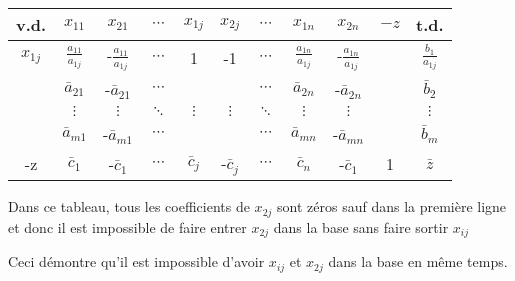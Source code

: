 \begin{center}
	\renewcommand{\arraystretch}{1.5}
	\begin{tabular}{|c|ccccccccc|c|}
		\hline
		  v.d.   &        $x_{11}$         &         $x_{21}$         & $\cdots$ &  $x_{1j}$   &   $x_{2j}$   & $\cdots$ &        $x_{1n}$         &         $x_{2n}$         & $-z$ &          t.d.          \\ \hline
		$x_{1j}$ & $\frac{a_{11}}{a_{1j}}$ & -$\frac{a_{11}}{a_{1j}}$ & $\cdots$ &      1      &      -1      & $\cdots$ & $\frac{a_{1n}}{a_{1j}}$ & -$\frac{a_{1n}}{a_{1j}}$ &      & $\frac{b_{1}}{a_{1j}}$ \\
		         &     $\bar{a}_{21}$      &     -$\bar{a}_{21}$      & $\cdots$ &             &              & $\cdots$ &     $\bar{a}_{2n}$      &     -$\bar{a}_{2n}$      &      &     $\bar{b}_{2}$      \\
		         &        $\vdots$         &         $\vdots$         & $\ddots$ &  $\vdots$   &   $\vdots$   & $\ddots$ &        $\vdots$         &         $\vdots$         &      &        $\vdots$        \\
		         &     $\bar{a}_{m1}$      &     -$\bar{a}_{m1}$      & $\cdots$ &             &              & $\cdots$ &     $\bar{a}_{mn}$      &     -$\bar{a}_{mn}$      &      &      $\bar{b}_m$       \\ \hline
		   -z    &      $\bar{c}_{1}$      &       -$\bar{c}_1$       & $\cdots$ & $\bar{c}_j$ & -$\bar{c}_j$ & $\cdots$ &       $\bar{c}_n$       &       -$\bar{c}_1$       &  1   &       $\bar{z}$        \\ \hline
	\end{tabular}
\end{center}

Dans ce tableau, tous les coefficients de $x_{2j}$ sont zéros sauf dans la première ligne et donc il est impossible de faire entrer $x_{2j}$ dans la base sans faire sortir $x_{ij}$

Ceci démontre qu’il est impossible d’avoir $x_{ij}$ et $x_{2j}$ dans la base en même temps.
